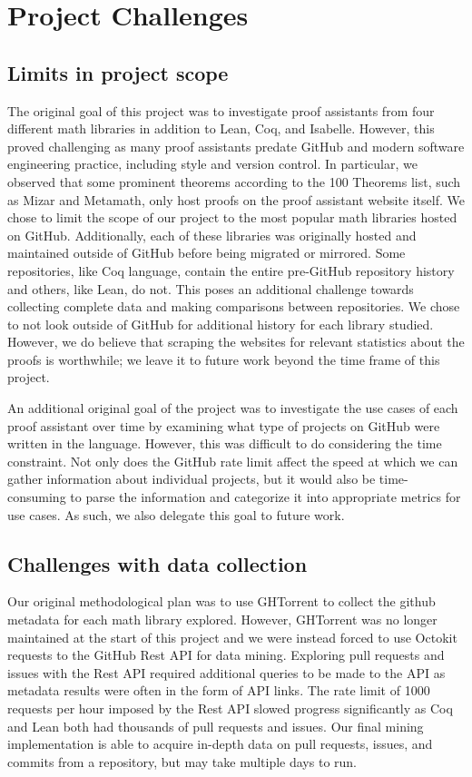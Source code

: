 \documentclass[sigconf,nonacm]{acmart}
\begin{document}
\section{Project Challenges}

\subsection{Limits in project scope}

The original goal of this project was to investigate proof assistants from four different math libraries in addition to Lean, Coq, and Isabelle. However, this proved challenging as many proof assistants predate GitHub and modern software engineering practice, including style and version control. In particular, we observed that some prominent theorems according to the 100 Theorems list, such as Mizar and Metamath, only host proofs on the proof assistant website itself. We chose to limit the scope of our project to the most popular math libraries hosted on GitHub. Additionally, each of these libraries was originally hosted and maintained outside of GitHub before being migrated or mirrored. Some repositories, like Coq language, contain the entire pre-GitHub repository history and others, like Lean, do not. This poses an additional challenge towards collecting complete data and making comparisons between repositories. We chose to not look outside of GitHub for additional history for each library studied. However, we do believe that scraping the websites for relevant statistics about the proofs is worthwhile; we leave it to future work beyond the time frame of this project.

An additional original goal of the project was to investigate the use cases of each proof assistant over time by examining what type of projects on GitHub were written in the language. However, this was difficult to do considering the time constraint. Not only does the GitHub rate limit affect the speed at which we can gather information about individual projects, but it would also be time-consuming to parse the information and categorize it into appropriate metrics for use cases. As such, we also delegate this goal to future work.

\subsection{Challenges with data collection}

Our original methodological plan was to use GHTorrent to collect the github metadata for each math library explored. However, GHTorrent was no longer maintained at the start of this project and we were instead forced to use Octokit requests to the GitHub Rest API for data mining. Exploring pull requests and issues with the Rest API required additional queries to be made to the API as metadata results were often in the form of API links. The rate limit of 1000 requests per hour imposed by the Rest API slowed progress significantly as Coq and Lean both had thousands of pull requests and issues. Our final mining implementation is able to acquire in-depth data on pull requests, issues, and commits from a repository, but may take multiple days to run.
\end{document}
